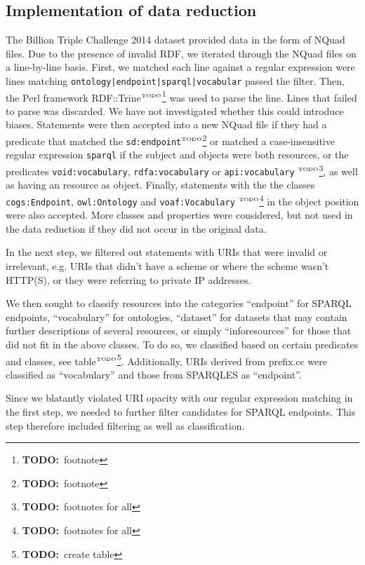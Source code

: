 \documentclass{article}
\newcommand{\rdfterm}[1]{\texttt{#1}}
\newcommand{\todo}[1]{\ensuremath{^{\textrm{\tiny{TODO}\normalsize}}}\footnote{\textbf{TODO:}~#1}}
\begin{document}
\begin{appendices}

\section{Implementation of data reduction}\label{app:reduction}

The Billion Triple Challenge 2014 dataset provided data in the form of
NQuad files. Due to the presence of invalid RDF, we iterated through
the NQuad files on a line-by-line basis. First, we matched each line
against a regular expression were lines matching
\texttt{ontology|endpoint|sparql|vocabular} passed the filter. Then,
the Perl framework RDF::Trine\todo{footnote} was used to parse the
line. Lines that failed to parse was discarded. We have not
investigated whether this could introduce biases. Statements were then
accepted into a new NQuad file if they had a predicate that matched
the \rdfterm{sd:endpoint}\todo{footnote} or matched a case-insensitive
regular expression \texttt{sparql} if the subject and objects were
both resources, or the predicates \rdfterm{void:vocabulary},
\rdfterm{rdfa:vocabulary} or \rdfterm{api:vocabulary} \todo{footnotes
  for all}, as well as having an resource as object. Finally,
statements with the the classes \rdfterm{cogs:Endpoint},
\rdfterm{owl:Ontology} and \rdfterm{voaf:Vocabulary} \todo{footnotes
  for all} in the object position were also accepted. More classes and
properties were considered, but not used in the data reduction if they
did not occur in the original data.

In the next step, we filtered out statements with URIs that were
invalid or irrelevant, e.g. URIs that didn't have a scheme or where
the scheme wasn't HTTP(S), or they were referring to private IP addresses.

We then sought to classify resources into the categories ``endpoint''
for SPARQL endpoints, ``vocabulary'' for ontologies, ``dataset'' for
datasets that may contain further descriptions of several resources,
or simply ``inforesources'' for those that did not fit in the above
classes. To do so, we classified based on certain predicates and
classes, see table\todo{create table}. Additionally, URIs derived from
prefix.cc were classified as ``vocabulary'' and those from SPARQLES as
``endpoint''.

Since we blatantly violated URI opacity with our regular expression
matching in the first step, we needed to further filter candidates for
SPARQL endpoints. This step therefore included filtering as well as
classification.


\end{appendices}
\end{document}
